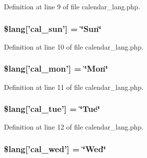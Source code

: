 Definition at line 9 of file calendar\-\_\-lang.\-php.

\hypertarget{calendar__lang_8php_a6a2329330c22e5e6058f53061fae0b62}{
\subsubsection[{\$lang}]{\setlength{\rightskip}{0pt plus 5cm}\$lang\mbox{[}'cal\-\_\-sun'\mbox{]} = \char`\"{}Sun\char`\"{}}}\label{calendar__lang_8php_a6a2329330c22e5e6058f53061fae0b62}


Definition at line 10 of file calendar\-\_\-lang.\-php.

\hypertarget{calendar__lang_8php_a3e1c2966ff8ebb4b528d9a6e60a7a11c}{
\subsubsection[{\$lang}]{\setlength{\rightskip}{0pt plus 5cm}\$lang\mbox{[}'cal\-\_\-mon'\mbox{]} = \char`\"{}Mon\char`\"{}}}\label{calendar__lang_8php_a3e1c2966ff8ebb4b528d9a6e60a7a11c}


Definition at line 11 of file calendar\-\_\-lang.\-php.

\hypertarget{calendar__lang_8php_ad6b1b4ce855d9ed3f88dc4e7e71f5248}{
\subsubsection[{\$lang}]{\setlength{\rightskip}{0pt plus 5cm}\$lang\mbox{[}'cal\-\_\-tue'\mbox{]} = \char`\"{}Tue\char`\"{}}}\label{calendar__lang_8php_ad6b1b4ce855d9ed3f88dc4e7e71f5248}


Definition at line 12 of file calendar\-\_\-lang.\-php.

\hypertarget{calendar__lang_8php_a94d7b85acb850c5930399c9099b22412}{
\subsubsection[{\$lang}]{\setlength{\rightskip}{0pt plus 5cm}\$lang\mbox{[}'cal\-\_\-wed'\mbox{]} = \char`\"{}Wed\char`\"{}}}\label{calendar__lang_8php_a94d7b85acb850c5930399c9099b22412}


